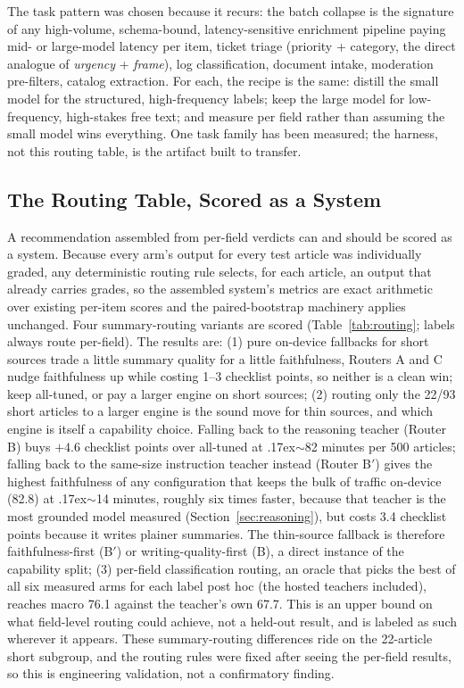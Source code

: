 \documentclass[10pt,journal]{IEEEtran}
\begin{document}
The task pattern was chosen because it recurs: the batch collapse is the signature of any high-volume, schema-bound, latency-sensitive enrichment pipeline paying mid- or large-model latency per item, ticket triage (priority + category, the direct analogue of \emph{urgency} + \emph{frame}), log classification, document intake, moderation pre-filters, catalog extraction. For each, the recipe is the same: distill the small model for the structured, high-frequency labels; keep the large model for low-frequency, high-stakes free text; and measure per field rather than assuming the small model wins everything. One task family has been measured; the harness, not this routing table, is the artifact built to transfer.

\subsection{The Routing Table, Scored as a System}\label{sec:routing}
A recommendation assembled from per-field verdicts can and should be scored as a system. Because every arm's output for every test article was individually graded, any deterministic routing rule selects, for each article, an output that already carries grades, so the assembled system's metrics are exact arithmetic over existing per-item scores and the paired-bootstrap machinery applies unchanged. Four summary-routing variants are scored (Table~\ref{tab:routing}; labels always route per-field). The results are: (1) pure on-device fallbacks for short sources trade a little summary quality for a little faithfulness, Routers A and C nudge faithfulness up while costing 1--3 checklist points, so neither is a clean win; keep all-tuned, or pay a larger engine on short sources; (2) routing only the 22/93 short articles to a larger engine is the sound move for thin sources, and which engine is itself a capability choice. Falling back to the reasoning teacher (Router B) buys $+4.6$ checklist points over all-tuned at {\raise.17ex\hbox{$\scriptstyle\sim$}}82 minutes per 500 articles; falling back to the same-size instruction teacher instead (Router B$'$) gives the highest faithfulness of any configuration that keeps the bulk of traffic on-device (82.8) at {\raise.17ex\hbox{$\scriptstyle\sim$}}14 minutes, roughly six times faster, because that teacher is the most grounded model measured (Section~\ref{sec:reasoning}), but costs 3.4 checklist points because it writes plainer summaries. The thin-source fallback is therefore faithfulness-first (B$'$) or writing-quality-first (B), a direct instance of the capability split; (3) per-field classification routing, an oracle that picks the best of all six measured arms for each label post hoc (the hosted teachers included), reaches macro 76.1 against the teacher's own 67.7. This is an upper bound on what field-level routing could achieve, not a held-out result, and is labeled as such wherever it appears. These summary-routing differences ride on the 22-article short subgroup, and the routing rules were fixed after seeing the per-field results, so this is engineering validation, not a confirmatory finding.
\end{document}

